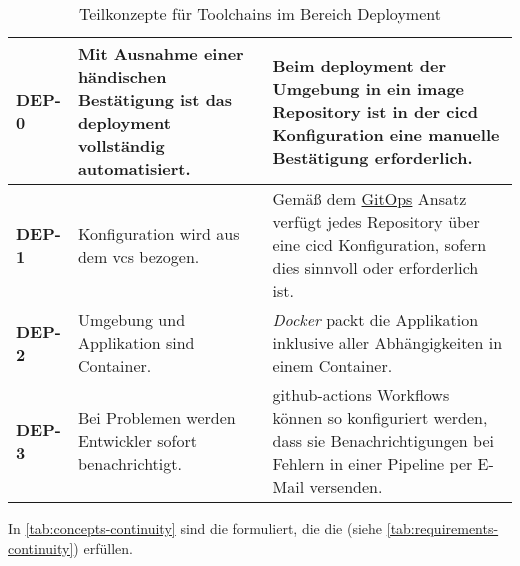 \begin{table}[H]
    \begin{tabular}{ >{\bfseries\ttfamily}p{} >{}p{} | >{}p{} }
        DEP-0   &   Mit Ausnahme einer händischen Bestätigung ist das \Gls{deployment} vollständig automatisiert. &
        Beim \Gls{deployment} der Umgebung in ein \Gls{image} Repository ist in der \Gls{cicd} Konfiguration eine manuelle Bestätigung erforderlich. \\
        \hline
        DEP-1   &   Konfiguration wird aus dem \Gls{vcs} bezogen. &
        Gemäß dem \hyperref[sec:03-03_gitops-as-further-evolution]{GitOps} Ansatz verfügt jedes Repository über eine \Gls{cicd} Konfiguration, sofern dies sinnvoll oder erforderlich ist. \\
        \hline
        DEP-2   &   Umgebung und Applikation sind Container. &
        \textit{Docker} packt die Applikation inklusive aller Abhängigkeiten in einem Container. \\
        \hline
        DEP-3   &   Bei Problemen werden Entwickler sofort benachrichtigt. &
        \Gls{github-actions} Workflows können  so konfiguriert werden, dass sie Benachrichtigungen bei Fehlern in einer Pipeline per E-Mail versenden. \\
    \end{tabular}
    \caption{Teilkonzepte für Toolchains im Bereich Deployment}
    \label{tab:concepts-deployment}
\end{table}

In \autoref{tab:concepts-continuity} sind die  formuliert, die die  (siehe \autoref{tab:requirements-continuity}) erfüllen.

